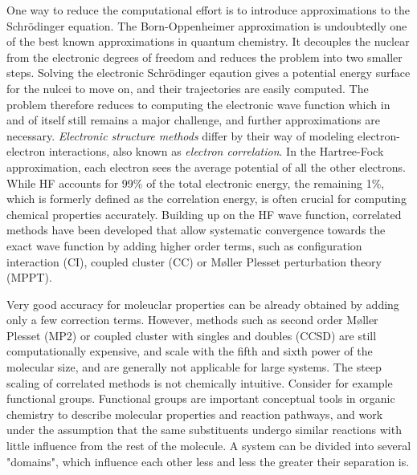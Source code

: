 One way to reduce the computational effort is to introduce approximations to the Schrödinger equation. The Born-Oppenheimer approximation  is undoubtedly one of the best known approximations in quantum chemistry. It decouples the nuclear from the electronic degrees of freedom and reduces the problem into two smaller steps. Solving the electronic Schrödinger eqaution gives a potential energy surface for the nulcei to move on, and their trajectories are easily computed. The problem therefore reduces to computing the electronic wave function which in and of itself still remains a major challenge, and further approximations are necessary. \emph{Electronic structure methods} differ by their way of modeling electron-electron interactions, also known as \emph{electron correlation}. In the Hartree-Fock approximation, each electron sees the average potential of all the other electrons. While HF accounts for 99\% of the total electronic energy, the remaining 1\%, which is formerly defined as the correlation energy, is often crucial for computing chemical properties accurately. Building up on the HF wave function, correlated methods have been developed that allow systematic convergence towards the exact wave function by adding higher order terms, such as configuration interaction (CI), coupled cluster (CC) or M{\o}ller Plesset perturbation theory (MPPT). 

Very good accuracy for moleuclar properties can be already obtained by adding only a few correction terms. However, methods such as second order M{\o}ller Plesset (MP2) or coupled cluster with singles and doubles (CCSD) are still computationally expensive, and scale with the fifth and sixth power of the molecular size, and are generally not applicable for large systems. The steep scaling of correlated methods is not chemically intuitive. Consider for example functional groups. Functional groups are important conceptual tools in organic chemistry to describe molecular properties and reaction pathways, and work under the assumption that the same substituents undergo similar reactions with little influence from the rest of the molecule. A system can be divided into several "domains", which influence each other less and less the greater their separation is. 

